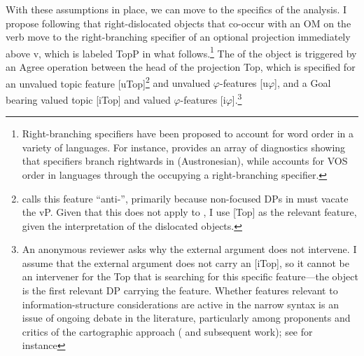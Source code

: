 \documentclass[output=paper
,newtxmath
,modfonts
,nonflat]{langsci/langscibook}
\begin{document}
\textup{With these assumptions in place, we can move to the specifics of the analysis. I propose following \citet{Zeller2015} that right-dislocated objects that co-occur with an OM on the verb move to the right-branching specifier of an optional projection immediately above} v\textup{, which is labeled TopP in what follows}.\footnote{Right-branching specifiers have been proposed to account for word order in a variety of languages. For instance, \citet{Chung1998} provides an array of diagnostics showing that specifiers branch rightwards in  (Austronesian), while \citet{Aissen1992} accounts for VOS order in  languages through the  occupying a right-branching specifier.}\textup{ The  of the object is triggered by an Agree operation between the head of the projection Top, which is specified for an unvalued topic feature [uTop]}\footnote{\citet{Zeller2015} calls this feature “anti-”, primarily because non-focused DPs in  must vacate the vP. Given that this does not apply to , I use [Top] as the relevant feature, given the interpretation of the dislocated objects.} \textup{and unvalued $\varphi $-features [u$\varphi $], and a Goal bearing valued topic [iTop] and valued $\varphi $-features [i$\varphi $]}.\footnote{An anonymous reviewer asks why the external argument does not intervene. I assume that the external argument does not carry an [iTop], so it cannot be an intervener for the Top that is searching for this specific feature—the object is the first relevant DP carrying the feature. Whether features relevant to information-structure considerations are active in the narrow syntax is an issue of ongoing debate in the literature, particularly among proponents and critics of the cartographic approach (\citealt{rizzi1997} and subsequent work); see for instance 
}
\end{document}

